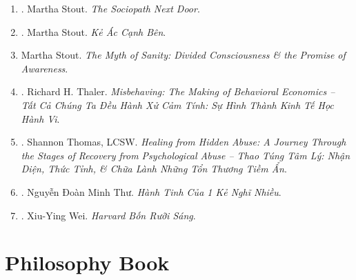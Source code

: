 \documentclass{article}
\begin{document}
\begin{enumerate}
	\item \cite{Stout2006}. Martha Stout. {\it The Sociopath Next Door}.\hfill{\sf[reading]}
	\item \cite{Stout2019}. Martha Stout. {\it Kẻ Ác Cạnh Bên}.\hfill{\sf[done]}	
	\item Martha Stout. {\it The Myth of Sanity: Divided Consciousness \& the Promise of Awareness}.	
	\item \cite{Thaler_misbehaving}. Richard H. Thaler. {\it Misbehaving: The Making of Behavioral Economics -- Tất Cả Chúng Ta Đều Hành Xử Cảm Tính: Sự Hình Thành Kinh Tế Học Hành Vi}.\hfill{\sf[reading]}
	\item \cite{Thomas2021}. Shannon Thomas, LCSW. {\it Healing from Hidden Abuse: A Journey Through the Stages of Recovery from Psychological Abuse -- Thao Túng Tâm Lý: Nhận Diện, Thức Tỉnh, \& Chữa Lành Những Tổn Thương Tiềm Ẩn}.\hfill{\sf[done]}
	\item \cite{Thu2022}. Nguyễn Đoàn Minh Thư. {\it Hành Tinh Của 1  Kẻ Nghĩ Nhiều}.\hfill{\sf[done]}
	\item \cite{Wei2022}. Xiu-Ying Wei. {\it Harvard Bốn Rưỡi Sáng}.\hfill{\sf[done]}
\end{enumerate}


\section{Philosophy Book}
\end{document}
